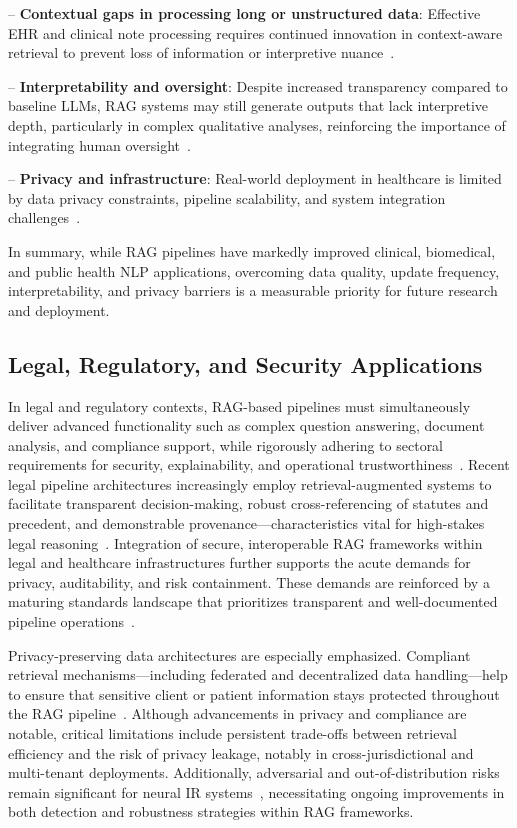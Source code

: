 \documentclass[sigconf]{acmart}
\begin{document}
-- \textbf{Contextual gaps in processing long or unstructured data}: Effective EHR and clinical note processing requires continued innovation in context-aware retrieval to prevent loss of information or interpretive nuance~\cite{ref3, ref49}.

-- \textbf{Interpretability and oversight}: Despite increased transparency compared to baseline LLMs, RAG systems may still generate outputs that lack interpretive depth, particularly in complex qualitative analyses, reinforcing the importance of integrating human oversight~\cite{ref56}.

-- \textbf{Privacy and infrastructure}: Real-world deployment in healthcare is limited by data privacy constraints, pipeline scalability, and system integration challenges~\cite{ref29, ref30, ref31, ref52}.

In summary, while RAG pipelines have markedly improved clinical, biomedical, and public health NLP applications, overcoming data quality, update frequency, interpretability, and privacy barriers is a measurable priority for future research and deployment.

\subsection{Legal, Regulatory, and Security Applications}

In legal and regulatory contexts, RAG-based pipelines must simultaneously deliver advanced functionality such as complex question answering, document analysis, and compliance support, while rigorously adhering to sectoral requirements for security, explainability, and operational trustworthiness~\cite{ref63, ref64}. Recent legal pipeline architectures increasingly employ retrieval-augmented systems to facilitate transparent decision-making, robust cross-referencing of statutes and precedent, and demonstrable provenance---characteristics vital for high-stakes legal reasoning~\cite{ref63}. Integration of secure, interoperable RAG frameworks within legal and healthcare infrastructures further supports the acute demands for privacy, auditability, and risk containment. These demands are reinforced by a maturing standards landscape that prioritizes transparent and well-documented pipeline operations~\cite{ref63, ref64}.

Privacy-preserving data architectures are especially emphasized. Compliant retrieval mechanisms---including federated and decentralized data handling---help to ensure that sensitive client or patient information stays protected throughout the RAG pipeline~\cite{ref21, ref22, ref23, ref24, ref25, ref26, ref32, ref33, ref34, ref36, ref37, ref38, ref39, ref40, ref43, ref45, ref46, ref49, ref50, ref54, ref55, ref63}. Although advancements in privacy and compliance are notable, critical limitations include persistent trade-offs between retrieval efficiency and the risk of privacy leakage, notably in cross-jurisdictional and multi-tenant deployments. Additionally, adversarial and out-of-distribution risks remain significant for neural IR systems~\cite{ref26}, necessitating ongoing improvements in both detection and robustness strategies within RAG frameworks.
\end{document}
